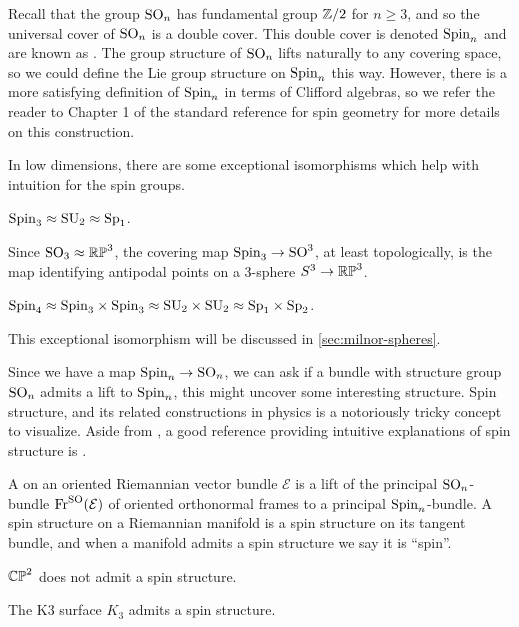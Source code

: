 Recall that the group $\mathrm{SO}_n$ has fundamental group $\mathbb{Z}/2$ for $n\geq 3$, and so the universal cover of $\mathrm{SO}_n$ is a double cover. This double cover is denoted $\mathrm{Spin}_n$ and are known as . The group structure of $\mathrm{SO}_n$ lifts naturally to any covering space, so we could define the Lie group structure on $\mathrm{Spin}_n$ this way. However, there is a more satisfying definition of $\mathrm{Spin}_n$ in terms of Clifford algebras, so we refer the reader to Chapter 1 of the standard reference for spin geometry \cite{lawson1989spin} for more details on this construction.

In low dimensions, there are some exceptional isomorphisms which help with intuition for the spin groups.
\begin{example}
	$\mathrm{Spin}_3\approx \mathrm{SU}_2\approx \mathrm{Sp}_1$.

	Since $\mathrm{SO}_3\approx \mathbb{RP}^3$, the covering map $\mathrm{Spin}_3 \to \mathrm{SO}^3$, at least topologically, is the map identifying antipodal points on a $3$-sphere $S^3\to \mathbb{RP}^3$.
\end{example}
\begin{example}
	$\mathrm{Spin}_4\approx \mathrm{Spin}_3\times\mathrm{Spin}_3\approx \mathrm{SU}_2\times \mathrm{SU}_2\approx \mathrm{Sp}_1\times \mathrm{Sp}_2$.

	This exceptional isomorphism will be discussed in \cref{sec:milnor-spheres}.
\end{example}

Since we have a map $\mathrm{Spin}_n \to \mathrm{SO}_n$, we can ask if a bundle with structure group $\mathrm{SO}_n$ admits a lift to $\mathrm{Spin}_n$, this might uncover some interesting structure. Spin structure, and its related constructions in physics is a notoriously tricky concept to visualize. Aside from \cite{lawson1989spin}, a good reference providing intuitive explanations of spin structure is \cite{nakahara2003}.

\begin{definition}
	A  on an oriented Riemannian vector bundle $\mathcal{E}$ is a lift of the principal $\mathrm{SO}_n$-bundle $\operatorname{Fr}^{\mathrm{SO}}(\mathcal{E})$ of oriented orthonormal frames to a principal $\mathrm{Spin}_n$-bundle. A spin structure on a Riemannian manifold is a spin structure on its tangent bundle, and when a manifold admits a spin structure we say it is ``spin''.
\end{definition}

\begin{example}
	$\mathbb{CP}^2$ does not admit a spin structure.
\end{example}

\begin{example}
	The K3 surface $K_3$ admits a spin structure.
\end{example}


